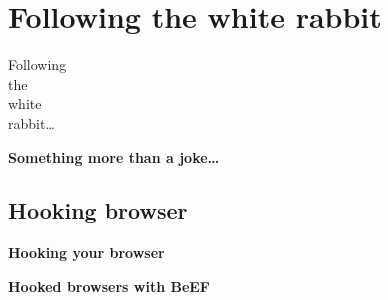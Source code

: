 
\section{Following the white rabbit}

{
\begin{frame}[plain]
    \Huge\bfseries
    \hspace{6.5cm}
    \begin{minipage}{.3\textwidth}
      Following \\
      the \\
      white \\
      rabbit\ldots
    \end{minipage}
\end{frame}
}

{
\begin{frame}[plain]
  \begin{center}
    \LARGE\bfseries
    Something more than a joke\ldots
  \end{center}

  \vspace{.5cm}

  \begin{center}
  \end{center}
\end{frame}
}

\subsection{Hooking browser}

{
\begin{frame}[plain]
    \begin{center}
      \Huge\bfseries
      Hooking your browser
    \end{center}
\end{frame}
}

{
\begin{frame}[plain]
  \begin{center}
    \LARGE\bfseries
    Hooked browsers with BeEF
  \end{center}

  \vspace{.5cm}

  \begin{center}
  \end{center}
\end{frame}
}

